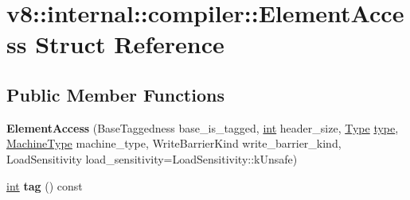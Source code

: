 \hypertarget{structv8_1_1internal_1_1compiler_1_1ElementAccess}{}\section{v8\+:\+:internal\+:\+:compiler\+:\+:Element\+Access Struct Reference}
\label{structv8_1_1internal_1_1compiler_1_1ElementAccess}
\subsection*{Public Member Functions}
\begin{DoxyCompactItemize}
\item 
\mbox{\label{structv8_1_1internal_1_1compiler_1_1ElementAccess_aa5865912c002d644c8da5316a1b48193}} 
{\bfseries Element\+Access} (Base\+Taggedness base\+\_\+is\+\_\+tagged, \mbox{\hyperlink{classint}{int}} header\+\_\+size, \mbox{\hyperlink{classv8_1_1internal_1_1compiler_1_1Type}{Type}} \mbox{\hyperlink{classstd_1_1conditional_1_1type}{type}}, \mbox{\hyperlink{classv8_1_1internal_1_1MachineType}{Machine\+Type}} machine\+\_\+type, Write\+Barrier\+Kind write\+\_\+barrier\+\_\+kind, Load\+Sensitivity load\+\_\+sensitivity=Load\+Sensitivity\+::k\+Unsafe)
\item 
\mbox{\label{structv8_1_1internal_1_1compiler_1_1ElementAccess_ab9f8083700200587a79660d822103b59}} 
\mbox{\hyperlink{classint}{int}} {\bfseries tag} () const
\end{DoxyCompactItemize}
